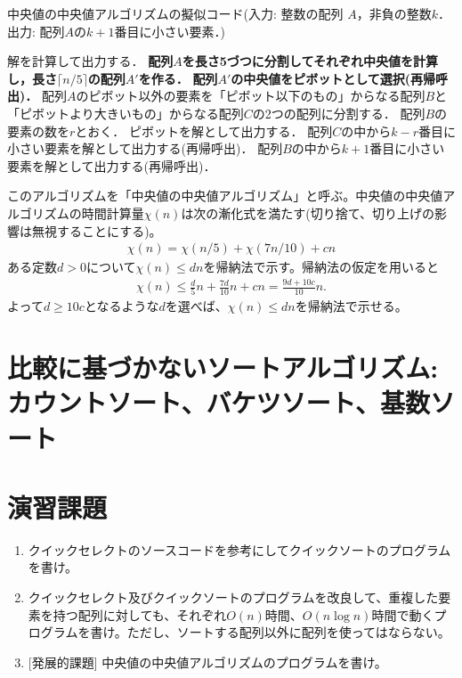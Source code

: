 \documentclass[a4paper,twoside,onecolumn,openany,article,10pt]{memoir}
\theoremstyle{remark}
\begin{document}
\begin{algorithm}
\caption{中央値の中央値アルゴリズムの擬似コード(入力: 整数の配列 $A$，非負の整数$k$．出力: 配列$A$の$k+1$番目に小さい要素．)}
\label{alg:qselectl}
\begin{algorithmic}
  \State 解を計算して出力する．
\Else
  \State \textbf{配列$A$を長さ5づつに分割してそれぞれ中央値を計算し，長さ$\lceil n/5\rceil$の配列$A'$を作る．}
  \State \textbf{配列$A'$の中央値をピボットとして選択(再帰呼出)．}
  \State 配列$A$のピボット以外の要素を「ピボット以下のもの」からなる配列$B$と「ピボットより大きいもの」からなる配列$C$の2つの配列に分割する．
  \State 配列$B$の要素の数を$r$とおく．
    \State ピボットを解として出力する．
    \State 配列$C$の中から$k-r$番目に小さい要素を解として出力する(再帰呼出)．
  \Else
    \State 配列$B$の中から$k+1$番目に小さい要素を解として出力する(再帰呼出)．
  \EndIf
\EndIf
\end{algorithmic}
\end{algorithm}

このアルゴリズムを「中央値の中央値アルゴリズム」と呼ぶ。中央値の中央値アルゴリズムの時間計算量$\chi(n)$は次の漸化式を満たす(切り捨て、切り上げの影響は無視することにする)。
\begin{align*}
\chi(n) = \chi(n/5) + \chi(7n/10) + cn
\end{align*}
ある定数$d>0$について$\chi(n)\le dn$を帰納法で示す。帰納法の仮定を用いると
\begin{align*}
\chi(n) \le \frac{d}{5}n + \frac{7d}{10}n + cn = \frac{9d + 10 c}{10} n.
\end{align*}
よって$d\ge 10 c$となるような$d$を選べば、$\chi(n)\le d n$を帰納法で示せる。

\section{比較に基づかないソートアルゴリズム: カウントソート、バケツソート、基数ソート}

\section{演習課題}
\begin{enumerate}
\item クイックセレクトのソースコードを参考にしてクイックソートのプログラムを書け。
\item クイックセレクト及びクイックソートのプログラムを改良して、重複した要素を持つ配列に対しても、それぞれ$O(n)$時間、$O(n\log n)$時間で動くプログラムを書け。ただし、ソートする配列以外に配列を使ってはならない。
\item {[発展的課題]} 中央値の中央値アルゴリズムのプログラムを書け。
\end{enumerate}
\end{document}
